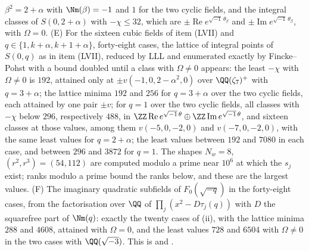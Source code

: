 \begin{enumerate}[label=\textup{(\Roman*)},leftmargin=*]
  $\beta^{2}=2+\alpha$ with $\Nm(\beta)=-1$ and $1$ for the two cyclic
  fields, and the integral classes of $S(0,2+\alpha)$ with $-\chi\le32$,
  which are $\pm\operatorname{Re}e^{\sqrt{-1}\,\theta_{\beta}}$ and
  $\pm\operatorname{Im}e^{\sqrt{-1}\,\theta_{\beta}}$, with $\Omega=0$. (E)
  For the sixteen cubic fields of item (LVII) and $q\in\{1,k+\alpha,
  k+1+\alpha\}$, forty-eight cases, the lattice of integral points of
  $S(0,q)$ as in item (LVII), reduced by LLL and enumerated exactly by
  Fincke--Pohst with a bound doubled until a class with $\Omega\ne0$
  appears: the least $-\chi$ with $\Omega\ne0$ is $192$, attained only at
  $\pm v(-1,0,2-\alpha^{2},0)$ over $\QQ(\zeta_{7})^{+}$ with $q=3+\alpha$;
  the lattice minima $192$ and $256$ for $q=3+\alpha$ over the two cyclic
  fields, each attained by one pair $\pm v$; for $q=1$ over the two cyclic
  fields, all classes with $-\chi$ below $296$, respectively $488$, in
  $\ZZ\operatorname{Re}e^{\sqrt{-1}\,\theta}\oplus\ZZ\operatorname{Im}
  e^{\sqrt{-1}\,\theta}$, and sixteen classes at those values, among them
  $v(-5,0,-2,0)$ and $v(-7,0,-2,0)$, with the same least values for
  $q=2+\alpha$; the least values between $192$ and $7080$ in each case, and
  between $296$ and $3872$ for $q=1$. The shapes $N_{w}=8$,
  $(r^{2},r^{3})=(54,112)$ are computed modulo a prime near $10^{6}$ at which
  the $s_{j}$ exist; ranks modulo a prime bound the ranks below, and these
  are the largest values. (F) The imaginary quadratic subfields of
  $F_{0}(\sqrt{-q})$ in the forty-eight cases, from the factorisation over
  $\QQ$ of $\prod_{j}(x^{2}-D\tau_{j}(q))$ with $D$ the squarefree part of
  $\Nm(q)$: exactly the twenty cases of (ii), with
  the lattice minima $288$ and $4608$, attained with $\Omega=0$, and the
  least values $728$ and $6504$ with $\Omega\ne0$ in the two cases with
  $\QQ(\sqrt{-3})$. This is  and
  .


\end{enumerate}
